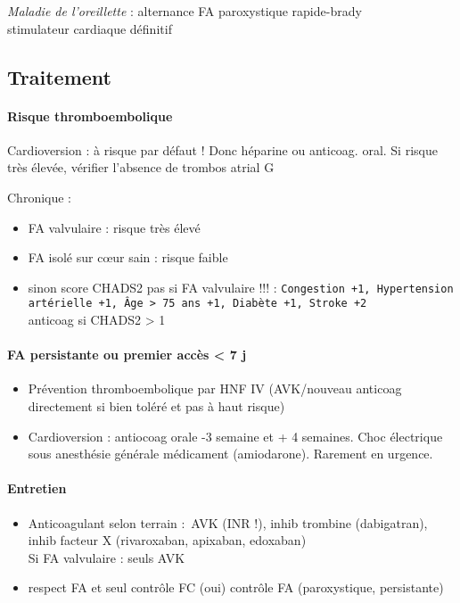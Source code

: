 \textit{Maladie de l'oreillette}  : alternance FA paroxystique rapide-brady\\
\thus stimulateur cardiaque définitif

\subsection{Traitement}
\paragraph{Risque thromboembolique}
Cardioversion : à risque par défaut ! Donc héparine ou anticoag. oral. 
Si risque très élevée, vérifier l'absence de trombos atrial G

Chronique :
\begin{itemize}
  \item FA valvulaire : risque très élevé
  \item FA isolé sur c\oe{}ur sain : risque faible
  \item sinon score CHADS2 \danger{} pas si FA valvulaire !!! : \texttt{Congestion +1,
    Hypertension artérielle +1, Âge > 75 ans +1, Diabète +1, Stroke +2}\\
    anticoag si CHADS2 > 1
\end{itemize}

\paragraph{FA persistante ou premier accès < 7 j}
\begin{itemize}
  \item Prévention thromboembolique par HNF IV (AVK/nouveau anticoag
    directement si bien toléré et pas à haut risque)
  \item Cardioversion : antiocoag orale -3 semaine et + 4 semaines. Choc
    électrique sous anesthésie générale \lor{} médicament (amiodarone). Rarement en
    urgence.
\end{itemize}

\paragraph{Entretien}
\begin{itemize}
  \item Anticoagulant selon terrain : AVK (INR !), inhib trombine (dabigatran), inhib
facteur X (rivaroxaban, apixaban, edoxaban)\\
Si FA valvulaire : seuls AVK
\item respect FA et seul contrôle FC (oui) \lor{} contrôle FA (paroxystique,
  persistante)
\end{itemize}


